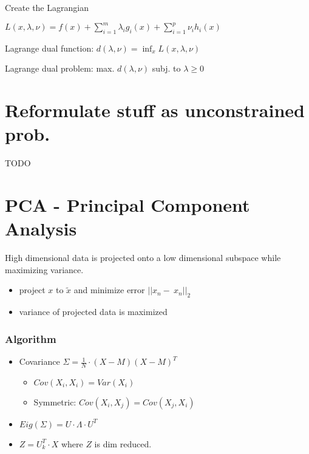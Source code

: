 \documentclass[11pt,twocolumn]{article}
\begin{document}
Create the Lagrangian

$L(x, \lambda, \nu) = f(x) + \sum_{i=1}^m{\lambda_i g_i(x) + \sum_{i=1}^p{\nu_i h_i(x)}}$

Lagrange dual function: $ d(\lambda, \nu) = \inf_{x} L (x,\lambda, \nu) $

Lagrange dual problem: max. $d(\lambda, \nu)$  subj. to $\lambda \geq 0$


\section{Reformulate stuff as unconstrained prob.}

TODO


\maketitle



\section{PCA - Principal Component Analysis}

High dimensional data is projected onto a low dimensional subspace while maximizing variance.

\begin{itemize}
\item project $x$ to $\tilde{x}$ and minimize error $|| x_n - ~x_n ||_2$
\item variance of projected data is maximized
\end{itemize}

\subsubsection{Algorithm}

\begin{itemize}
\item Covariance $\Sigma = \frac{1}{N} \cdot (  X - M ) ( X - M )^T$
\begin{itemize}
\item $Cov(X_i, X_i) = Var(X_i)$
\item Symmetric: $ Cov(X_i,X_j) = Cov(X_j, X_i)$
\end{itemize}
\item $Eig(\Sigma) = U \cdot \Lambda \cdot U^T$
\item $Z = U_k^T \cdot X$ where $Z$ is dim reduced.

\end{itemize}
\end{document}
